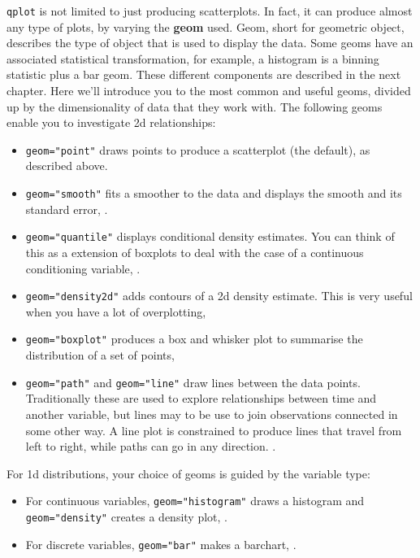 {\tt qplot} is not limited to just producing scatterplots.  In fact, it can produce almost any type of plots, by varying the {\bf geom} used. Geom, short for geometric object, describes the type of object that is used to display the data.  Some geoms have an associated statistical transformation, for example, a histogram is a binning statistic plus a bar geom.  These different components are described in the next chapter.  Here we'll introduce you to the most common and useful geoms, divided up by the dimensionality of data that they work with.  The following geoms enable you to investigate 2d relationships:

\begin{itemize}

	\item {\tt geom="point"} draws points to produce a scatterplot (the default), as described above.

	\item {\tt geom="smooth"} fits a smoother to the data and displays the smooth and its standard error, .

	\item {\tt geom="quantile"} displays conditional density estimates.  You can think of this as a extension of boxplots to deal with the case of a continuous conditioning variable, .

	\item {\tt geom="density2d"} adds contours of a 2d density estimate.  This is very useful when you have a lot of overplotting, 

	\item {\tt geom="boxplot"} produces a box and whisker plot to summarise the distribution of a set of points, 

	\item {\tt geom="path"} and {\tt geom="line"} draw lines between the data points.  Traditionally these are used to explore relationships between time and another variable, but lines may to be use to join observations connected in some other way.  A line plot is constrained to produce lines that travel from left to right, while paths can go in any direction.  .
\end{itemize}

For 1d distributions, your choice of geoms is guided by the variable type:

\begin{itemize}
	\item For continuous variables, {\tt geom="histogram"} draws a histogram and {\tt geom="density"} creates a density plot, .

  \item For discrete variables, {\tt geom="bar"} makes a barchart, .

\end{itemize}

